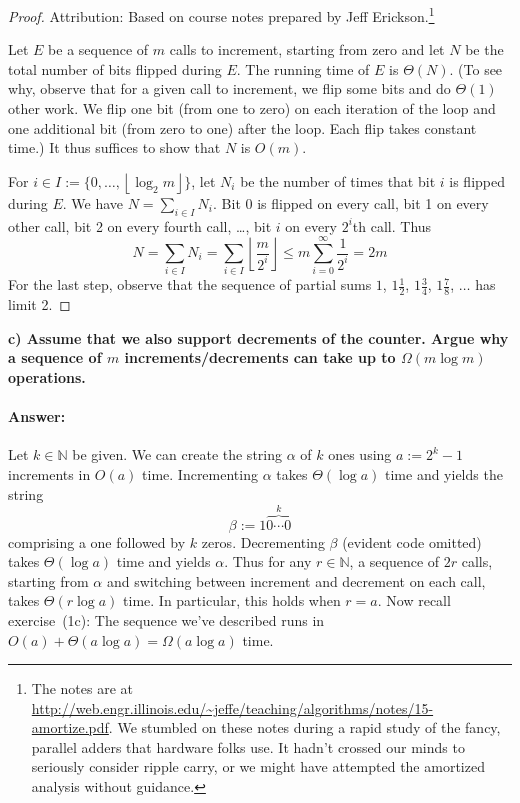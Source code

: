 \documentclass[a4paper]{article}
\newcommand*{\floor}[1]{\left\lfloor{#1}\right\rfloor}
\newcommand{\NN}{\mathbb{N}}
\begin{document}
\begin{proof}
Attribution:
Based on course notes prepared by Jeff Erickson.\footnote{%
	The notes are at \url{http://web.engr.illinois.edu/~jeffe/teaching/algorithms/notes/15-amortize.pdf}.
	We stumbled on these notes during a rapid study of the fancy, parallel adders that hardware folks use.
	It hadn't crossed our minds to seriously consider ripple carry, or we might have attempted the amortized analysis without guidance.}

Let $E$ be a sequence of $m$ calls to increment, starting from zero and let $N$ be the total number of bits flipped during $E$.
The running time of $E$ is $\Theta(N)$.
(To see why, observe that for a given call to increment, we flip some bits and do $\Theta(1)$ other work.
We flip one bit (from one to zero) on each iteration of the loop and one additional bit (from zero to one) after the loop.
Each flip takes constant time.)
It thus suffices to show that $N$ is $O(m)$.

For $i \in I := \{0, \dots, \floor{\log_2 m}\}$, let $N_i$ be the number of times that bit $i$ is flipped during $E$.
We have $N = \sum_{i \in I} N_i$.
Bit 0 is flipped on every call, bit 1 on every other call, bit 2 on every fourth call, \ldots, bit $i$ on every $2^i$th call.
Thus
\[
	N = \sum_{i \in I} N_i = \sum_{i \in I} \floor{ \frac{m}{2^i} } \le m \sum_{i=0}^\infty \frac{1}{2^i} = 2m
\]
For the last step, observe that the sequence of partial sums $1$, $1\frac{1}{2}$, $1\frac{3}{4}$, $1\frac{7}{8}$, $\ldots$ has limit 2.
\end{proof}

\bigskip \noindent \textbf{c) Assume that we also support decrements of the counter. Argue why a sequence of $m$ increments/decrements can take up to $\Omega(m \log m)$ operations.}

\paragraph{Answer:}
Let $k \in \NN$ be given.
We can create the string $\alpha$ of $k$ ones using $a := 2^k -1$ increments in $O(a)$ time.
Incrementing $\alpha$ takes $\Theta(\log a)$ time and yields the string
\[
	\beta := 1 \overbrace{0 \cdots 0}^{k}
\]
comprising a one followed by $k$ zeros.
Decrementing $\beta$ (evident code omitted) takes $\Theta(\log a)$ time and yields $\alpha$.
Thus for any $r \in \NN$, a sequence of $2r$ calls, starting from $\alpha$ and switching between increment and decrement on each call, takes $\Theta(r \log a)$ time.
In particular, this holds when $r = a$.
Now recall exercise~(1c):
The sequence we've described runs in $O(a) + \Theta(a \log a) = \Omega(a \log a)$ time.
\end{document}
